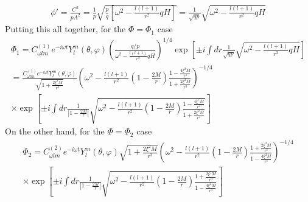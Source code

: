 \documentclass[12pt]{article}
\def\nn{\nonumber}
\begin{document}
\begin{gather}
\phi'
=
\frac{C^{2}}{p A^{2}}
=
\frac{1}{p}
\sqrt{
\frac{p}{q}
\left[
\omega^{2}
-
\frac{l (l +1)}{r^{2}}
q H
\right]}
=
\frac{1}{\sqrt{q p}}
\sqrt{
\omega^{2}
-
\frac{l (l +1)}{r^{2}}
q H}
\end{gather}
Putting this all together, for the $\Phi = \Phi_{1}$ case
\begin{gather}
\Phi_{1}
=
C_{\omega l m }^{(1)}
e^{- i \omega t}
Y_{l}^{m}(\theta, \varphi)
\left(
\frac{q/p}{\omega^{2}
-
\frac{l (l +1)}{r^{2}}
q H}
\right)^{1/4}
\exp\left[
\pm i \int dr \frac{1}{\sqrt{q p}}
\sqrt{
\omega^{2}
-
\frac{l (l +1)}{r^{2}}
q H} \right]
\nn \\
=
\frac{C_{\omega l m }^{(1)}
e^{- i \omega t}
Y_{l}^{m}(\theta, \varphi)}{\sqrt{1 + \frac{2 \xi^{2} M}{r^{3}}}}
\left(
\omega^{2}
-
\frac{l (l +1)}{r^{2}}
(1 - \frac{2 M}{r}) \frac{1 - \frac{4 \xi^{2} M}{r^{3}}}{1 + \frac{2 \xi^{2} M}{r^{3}}} 
\right)^{-1/4}
\nn \\
\times
\exp\left[
\pm i \int dr \frac{1}{|1 - \frac{2 M}{r}|}
\sqrt{
\omega^{2}
-
\frac{l (l +1)}{r^{2}}
(1 - \frac{2 M}{r}) \frac{1 - \frac{4 \xi^{2} M}{r^{3}}}{1 + \frac{2 \xi^{2} M}{r^{3}}} }\right]
\end{gather}
On the other hand, for the $\Phi = \Phi_{2}$ case
\begin{gather}
\Phi_{2}
=
C_{\omega l m }^{(2)}
e^{- i \omega t}
Y_{l}^{m}(\theta, \varphi)
\sqrt{1 + \frac{2 \xi^{2} M}{r^{3}}}
\left(
\omega^{2}
-
\frac{l (l +1)}{r^{2}}
(1 - \frac{2 M}{r}) \frac{1 + \frac{2 \xi^{2} M}{r^{3}}}{1 - \frac{4 \xi^{2} M}{r^{3}}} 
\right)^{-1/4}
\nn \\
\times
\exp\left[
\pm i \int dr \frac{1}{|1 - \frac{2 M}{r}|}
\sqrt{
\omega^{2}
-
\frac{l (l +1)}{r^{2}}
(1 - \frac{2 M}{r}) \frac{1+ \frac{2 \xi^{2} M}{r^{3}}}{1 - \frac{4 \xi^{2} M}{r^{3}}} }\right]
\end{gather}

\end{document}
